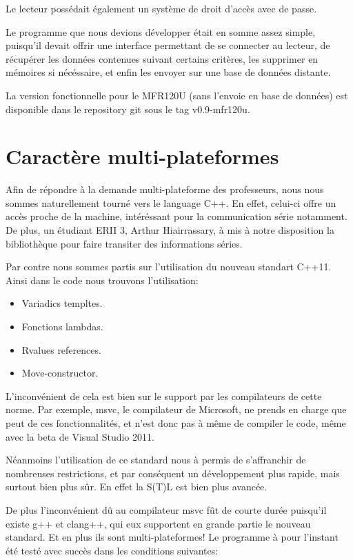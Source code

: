     Le lecteur possédait également un système de droit d'accès avec de passe.

    Le programme que nous devions développer était en somme assez simple, puisqu'il
devait offrir une interface permettant de se connecter au lecteur, de récupérer les
données contenues suivant certains critères, les supprimer en mémoires si nécéssaire,
et enfin les envoyer sur une base de données distante.

    La version fonctionnelle pour le MFR120U (sans l'envoie en base de données)
est disponible dans le repository git sous le tag v0.9-mfr120u.



\section{Caractère multi-plateformes}
    Afin de répondre à la demande multi-plateforme des professeurs, nous nous 
sommes naturellement tourné vers le language C++. En effet, celui-ci offre un accès
proche de la machine, intéréssant pour la communication série notamment. De plus,
un étudiant ERII 3, Arthur Hiairrassary, à mis à notre disposition la bibliothèque
pour faire transiter des informations séries.

    Par contre nous sommes partis sur l'utilisation du nouveau standart C++11. Ainsi
dans le code nous trouvons l'utilisation:

    \begin{itemize}
        \item Variadics templtes.
        \item Fonctions lambdas.
        \item Rvalues references.
        \item Move-constructor.
    \end{itemize}

    L'inconvénient de cela est bien sur le support par les compilateurs de cette
norme. Par exemple, msvc, le compilateur de Microsoft, ne prends en charge que peut
de ces fonctionnalités, et n'est donc pas à même de compiler le code, même avec la
beta de Visual Studio 2011.

    Néanmoins l'utilisation de ce standard nous à permis de s'affranchir de nombreuses
restrictions, et par conséquent un développement plus rapide, mais surtout bien
plus sûr. En effet la S(T)L est bien plus avancée.

    De plus l'inconvénient dû au compilateur msvc fût de courte durée puisqu'il
existe g++ et clang++, qui eux supportent en grande partie le nouveau standard.
Et en plus ils sont multi-plateformes! Le programme à pour l'instant été testé 
avec succès dans les conditions suivantes:


